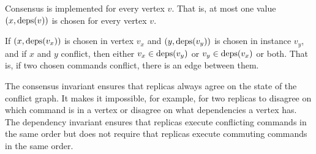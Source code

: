 \begin{invariant}
  Consensus is implemented for every vertex $v$. That is, at most one value
  $(x, \text{deps}(v))$ is chosen for every vertex $v$.
\end{invariant}%

\begin{invariant}
  If $(x, \text{deps}(v_x))$ is chosen in vertex $v_x$ and $(y, \text{deps}(v_y))$ is
  chosen in instance $v_y$, and if $x$ and $y$ conflict, then either $v_x \in
  \text{deps}(v_y)$ or $v_y \in \text{deps}(v_x)$ or both. That is, if two chosen commands
  conflict, there is an edge between them.
\end{invariant}

The consensus invariant ensures that replicas always agree on the state of the
conflict graph. It makes it impossible, for example, for two replicas to
disagree on which command is in a vertex or disagree on what dependencies a
vertex has. The dependency invariant ensures that replicas execute conflicting
commands in the same order but does not require that replicas execute commuting
commands in the same order.
%
